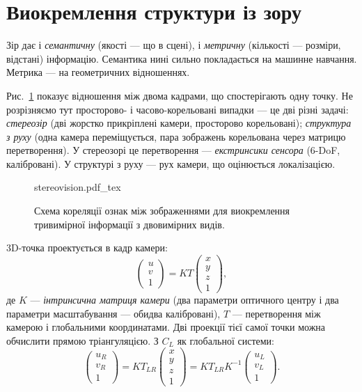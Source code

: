 \section{Виокремлення структури із зору}\label{sec:vision:structure}

Зір дає і \emph{семантичну} (якості — що в сцені), і \emph{метричну} (кількості — розміри, відстані) інформацію. Семантика нині сильно покладається на машинне навчання. Метрика — на геометричних відношеннях.

Рис.~\ref{fig:stereovision} показує відношення між двома кадрами, що спостерігають одну точку. Не розрізняємо тут просторово- і часово-корельовані випадки — це дві різні задачі: \emph{стереозір} (дві жорстко прикріплені камери, просторово корельовані); \emph{структура з руху} (одна камера переміщується, пара зображень корельована через матрицю перетворення). У стереозорі це перетворення — \emph{екстринсики сенсора} (6-DoF, калібровані). У структурі з руху — рух камери, що оцінюється локалізацією.

\begin{figure}
\centering
    \def\svgwidth{1.0\textwidth}
    {stereovision.pdf_tex}
\caption{Схема кореляції ознак між зображеннями для виокремлення тривимірної інформації з двовимірних видів.}
\label{fig:stereovision}
\end{figure}

3D-точка проектується в кадр камери:
\begin{equation}
\begin{pmatrix} u\\ v\\ 1 \end{pmatrix}
= K T \begin{pmatrix} x\\ y\\ z\\ 1 \end{pmatrix},
\label{eq:stereovision}
\end{equation}
де $K$ — \emph{інтринсична матриця камери} (два параметри оптичного центру і два параметри масштабування — обидва калібровані), $T$ — перетворення між камерою і глобальними координатами. Дві проекції тієї самої точки можна обчислити прямою тріангуляцією. З $C_L$ як глобальної системи:
\begin{equation}
\begin{pmatrix} u_R\\ v_R\\ 1 \end{pmatrix}
= K T_{LR} \begin{pmatrix} x \\ y \\ z \\ 1 \end{pmatrix}
= K T_{LR} K^{-1} \begin{pmatrix} u_L \\ v_L \\ 1 \end{pmatrix}.
\end{equation}

